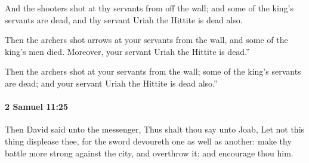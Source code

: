 			\begin{versebox}
					\item[BHS] 
					\item[ASV] And the shooters shot at thy servants from off the wall; and some of the king's servants are dead, and thy servant Uriah the Hittite is dead also.
					\item[NIV] Then the archers shot arrows at your servants from the wall, and some of the king’s men died. Moreover, your servant Uriah the Hittite is dead.”
					\item[NRSV] Then the archers shot at your servants from the wall; some of the king’s servants are dead; and your servant Uriah the Hittite is dead also.”
			\end{versebox}

		\paragraph{2 Samuel 11:25} %
			\label{2SAMUEL-11-25}

			Then David said unto the messenger, Thus shalt thou say unto Joab, Let not this thing displease thee, for the sword devoureth one as well as another: make thy battle more strong against the city, and overthrow it: and encourage thou him.

